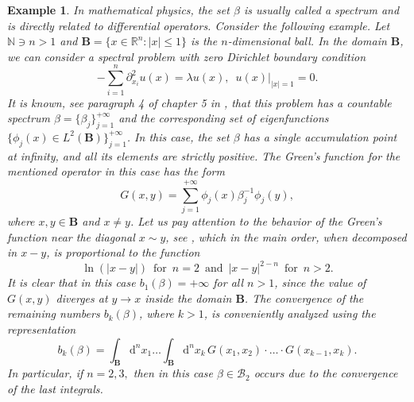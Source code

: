 \documentclass[a4paper]{article}
\newtheorem{remark}{Remark}
\newtheorem{exm}{Example}
\begin{document}
\begin{exm}\label{34-e-7}
In mathematical physics, the set $\beta$ is usually called a spectrum and is directly related to differential operators. Consider the following example. Let $\mathbb{N}\ni n>1$ and $\mathbf{B}=\{x\in\mathbb{R}^n:|x|\leqslant1\}$ is the $n$-dimensional ball. In the domain $\mathbf{B}$, we can consider a spectral problem with zero Dirichlet boundary condition
\begin{equation*}
-\sum_{i=1}^n\partial_{x_i}^2u(x)=\lambda u(x),\,\,\,
u(x)\big|_{|x|=1}=0.
\end{equation*}
It is known, see paragraph 4 of chapter 5 in \cite{34-14}, that this problem has a countable spectrum $\beta=\{\beta_j\}_{j=1}^{+\infty}$ and the corresponding set of eigenfunctions $\{\phi_j(x)\in L^2(\mathbf{B})\}_{j=1}^{+\infty}$. In this case, the set $\beta$ has a single accumulation point at infinity, and all its elements are strictly positive. The Green's function for the mentioned operator in this case has the form
\begin{equation*}
G(x,y)=\sum_{j=1}^{+\infty}\phi_j(x)\beta^{-1}_j\phi_j(y),
\end{equation*}
where $x,y\in\mathbf{B}$ and $x\neq y$. Let us pay attention to the behavior of the Green's function near the diagonal $x\sim y$, see \cite{29,30-1-1 }, which in the main order, when decomposed in $x-y$, is proportional to the function
\begin{equation*}
\ln(|x-y|)\,\,\,\mbox{for}\,\,\,n=2\,\,\,\mbox{and}\,\,\,
|x-y|^{2-n}\,\,\,\mbox{for}\,\,\,n>2.
\end{equation*}
It is clear that in this case $b_1(\beta)=+\infty$ for all $n>1$, since the value of $G(x,y)$ diverges at $y\to x$ inside the domain $\mathbf{B}$. The convergence of the remaining numbers $b_k(\beta)$, where $k>1$, is conveniently analyzed using the representation
\begin{equation*}
b_k(\beta)=\int_{\mathbf{B}}\mathrm{d}^nx_1\ldots\int_{\mathbf{B}}\mathrm{d}^nx_k\,
G(x_1,x_2)\cdot\ldots\cdot G(x_{k-1},x_k).
\end{equation*}
In particular, if $n=2,3,$ then in this case $\beta\in\mathcal{B}_2$ occurs due to the convergence of the last integrals.
\end{exm}
\end{document}
